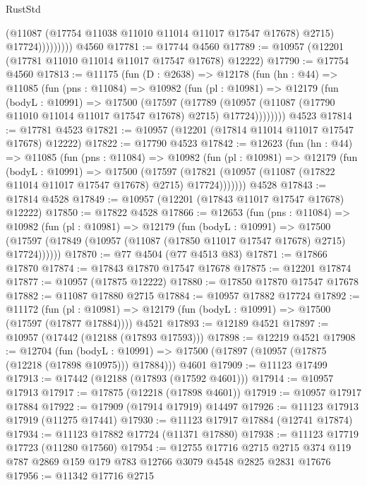 \begin{lexlean}{RustStd}
\begin{coremodule}
                      (@11087 (@17754 @11038 @11010 @11014 @11017 @17547 @17678) @2715)
                      @17724)))))))))
    @4560
@17781 := @17744 @4560
@17789 := @10957 (@12201 (@17781 @11010 @11014 @11017 @17547 @17678) @12222)
@17790 := @17754 @4560
@17813 := @11175
    (fun (D : @2638) =>
    @12178
      (fun (hn : @44) =>
      @11085
        (fun (pns : @11084) =>
        @10982
          (fun (pl : @10981) =>
          @12179
            (fun (bodyL : @10991) =>
            @17500
              (@17597
                (@17789
                  (@10957 (@11087 (@17790 @11010 @11014 @11017 @17547 @17678) @2715) @17724))))))))
    @4523
@17814 := @17781 @4523
@17821 := @10957 (@12201 (@17814 @11014 @11017 @17547 @17678) @12222)
@17822 := @17790 @4523
@17842 := @12623
    (fun (hn : @44) =>
    @11085
      (fun (pns : @11084) =>
      @10982
        (fun (pl : @10981) =>
        @12179
          (fun (bodyL : @10991) =>
          @17500
            (@17597
              (@17821 (@10957 (@11087 (@17822 @11014 @11017 @17547 @17678) @2715) @17724)))))))
    @4528
@17843 := @17814 @4528
@17849 := @10957 (@12201 (@17843 @11017 @17547 @17678) @12222)
@17850 := @17822 @4528
@17866 := @12653
    (fun (pns : @11084) =>
    @10982
      (fun (pl : @10981) =>
      @12179
        (fun (bodyL : @10991) =>
        @17500 (@17597 (@17849 (@10957 (@11087 (@17850 @11017 @17547 @17678) @2715) @17724))))))
@17870 := @77 @4504 (@77 @4513 @83)
@17871 := @17866 @17870
@17874 := @17843 @17870 @17547 @17678
@17875 := @12201 @17874
@17877 := @10957 (@17875 @12222)
@17880 := @17850 @17870 @17547 @17678
@17882 := @11087 @17880 @2715
@17884 := @10957 @17882 @17724
@17892 := @11172
    (fun (pl : @10981) => @12179 (fun (bodyL : @10991) => @17500 (@17597 (@17877 @17884))))
    @4521
@17893 := @12189 @4521
@17897 := @10957 (@17442 (@12188 (@17893 @17593)))
@17898 := @12219 @4521
@17908 := @12704
    (fun (bodyL : @10991) => @17500 (@17897 (@10957 (@17875 (@12218 (@17898 @10975))) @17884)))
    @4601
@17909 := @11123 @17499
@17913 := @17442 (@12188 (@17893 (@17592 @4601)))
@17914 := @10957 @17913
@17917 := @17875 (@12218 (@17898 @4601))
@17919 := @10957 @17917 @17884
@17922 := @17909 (@17914 @17919) @14497
@17926 := @11123 @17913 @17919 (@11275 @17441)
@17930 := @11123 @17917 @17884 (@12741 @17874)
@17934 := @11123 @17882 @17724 (@11371 @17880)
@17938 := @11123 @17719 @17723 (@11280 @17560)
@17954 := @12755
    @17716
    @2715
    @2715
    @374
    @119
    @787
    @2869
    @159
    @179
    @783
    @12766
    @3079
    @4548
    @2825
    @2831
    @17676
@17956 := @11342 @17716 @2715

\end{coremodule}
\end{lexlean}
